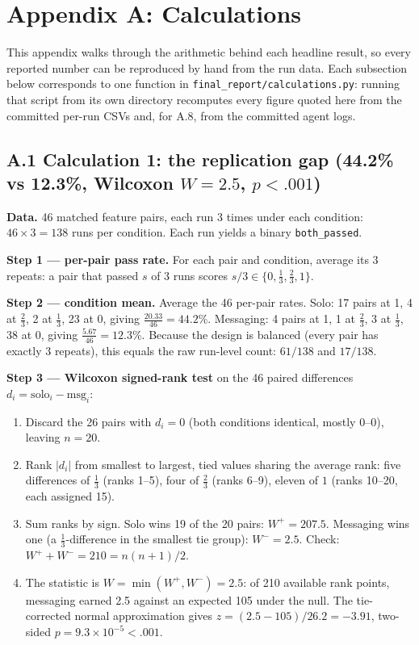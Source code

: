 \documentclass[11pt,a4paper]{article}
\begin{document}
\section*{Appendix A: Calculations}

This appendix walks through the arithmetic behind each headline result, so every reported number can be reproduced by hand from the run data. Each subsection below corresponds to one function in \texttt{final\_report/calculations.py}: running that script from its own directory recomputes every figure quoted here from the committed per-run CSVs and, for A.8, from the committed agent logs.

\subsection*{A.1 \quad Calculation 1: the replication gap (44.2\% vs 12.3\%, Wilcoxon $W = 2.5$, $p < .001$)}

\textbf{Data.} 46 matched feature pairs, each run 3 times under each condition: $46 \times 3 = 138$ runs per condition. Each run yields a binary \texttt{both\_passed}.

\textbf{Step 1 --- per-pair pass rate.} For each pair and condition, average its 3 repeats: a pair that passed $s$ of 3 runs scores $s/3 \in \{0, \tfrac{1}{3}, \tfrac{2}{3}, 1\}$.

\textbf{Step 2 --- condition mean.} Average the 46 per-pair rates. Solo: 17 pairs at 1, 4 at $\tfrac{2}{3}$, 2 at $\tfrac{1}{3}$, 23 at 0, giving $\tfrac{20.33}{46} = 44.2\%$. Messaging: 4 pairs at 1, 1 at $\tfrac{2}{3}$, 3 at $\tfrac{1}{3}$, 38 at 0, giving $\tfrac{5.67}{46} = 12.3\%$. Because the design is balanced (every pair has exactly 3 repeats), this equals the raw run-level count: $61/138$ and $17/138$.

\textbf{Step 3 --- Wilcoxon signed-rank test} on the 46 paired differences $d_i = \text{solo}_i - \text{msg}_i$:
\begin{enumerate}
    \item Discard the 26 pairs with $d_i = 0$ (both conditions identical, mostly $0$--$0$), leaving $n = 20$.
    \item Rank $|d_i|$ from smallest to largest, tied values sharing the average rank: five differences of $\tfrac{1}{3}$ (ranks 1--5), four of $\tfrac{2}{3}$ (ranks 6--9), eleven of $1$ (ranks 10--20, each assigned 15).
    \item Sum ranks by sign. Solo wins 19 of the 20 pairs: $W^{+} = 207.5$. Messaging wins one (a $\tfrac{1}{3}$-difference in the smallest tie group): $W^{-} = 2.5$. Check: $W^{+} + W^{-} = 210 = n(n+1)/2$.
    \item The statistic is $W = \min(W^{+}, W^{-}) = 2.5$: of 210 available rank points, messaging earned 2.5 against an expected 105 under the null. The tie-corrected normal approximation gives $z = (2.5 - 105)/26.2 = -3.91$, two-sided $p = 9.3 \times 10^{-5} < .001$.
\end{enumerate}
\end{document}
